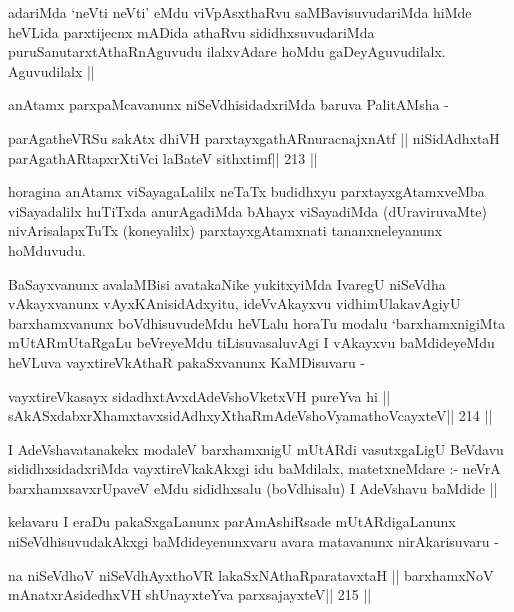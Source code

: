 \begin{artha}
adariMda `neVti neVti' eMdu viVpAsxthaRvu saMBavisuvudariMda hiMde
heVLida parxtijecnx mADida athaRvu sididhxsuvudariMda
puruSanutarxtAthaRnAguvudu ilalxvAdare hoMdu
gaDeyAguvudilalx. Aguvudilalx ||

anAtamx parxpaMcavanunx niSeVdhisidadxriMda baruva PalitAMsha -
\end{artha}

\begin{shl}
parAgatheVRSu sakAtx dhiVH parxtayxgathARnuracnajxnAtf ||
niSidAdhx\s taH parAgathARtapxrXtiVci laBateV sithxtimf\hfill || 213 ||
\end{shl}

\begin{artha}
horagina anAtamx viSayagaLalilx neTaTx budidhxyu parxtayxgAtamxveMba
viSayadalilx huTiTxda anurAgadiMda bAhayx viSayadiMda (dUraviruvaMte)
nivArisalapxTuTx (koneyalilx) parxtayxgAtamxnati tananxneleyanunx hoMduvudu.
\end{artha}

\begin{artha}
BaSayxvanunx avalaMBisi avatakaNike yukitxyiMda IvaregU niSeVdha
vAkayxvanunx vAyxKAnisidAdxyitu, ideVvAkayxvu vidhimUlakavAgiyU
barxhamxvanunx boVdhisuvudeMdu heVLalu horaTu modalu `barxhamxnigiMta
mUtARmUtaRgaLu beVreyeMdu tiLisuvasaluvAgi I vAkayxvu baMdideyeMdu
heVLuva vayxtireVkAthaR pakaSxvanunx KaMDisuvaru -
\end{artha}

\begin{shl}
vayxtireVkasayx sidadhxtAvxdAdeVshoVketxVH pureYva hi ||
sAkASxdabxrXhamxtavxsidAdhxyXthaRmAdeVshoV\s yamathoVcayxteV\hfill || 214 ||
\end{shl}

\begin{artha}
I AdeVshavatanakekx modaleV barxhamxnigU mUtARdi vasutxgaLigU BeVdavu
sididhxsidadxriMda vayxtireVkakAkxgi idu baMdilalx, matetxneMdare :-
neVrA barxhamxsavxrUpaveV eMdu sididhxsalu (boVdhisalu) I AdeVshavu
baMdide ||
\end{artha}

\begin{artha}
kelavaru I eraDu pakaSxgaLanunx parAmAshiRsade mUtARdigaLanunx
niSeVdhisuvudakAkxgi baMdideyenunxvaru avara matavanunx nirAkarisuvaru -
\end{artha}

\begin{shl}
na niSeVdhoV niSeVdhAyxthoVR lakaSxNAthaRparatavxtaH ||
barxhamxNoV mAnatxrAsidedhxVH shUnayxteYva parxsajayxteV\hfill || 215 ||
\end{shl}

